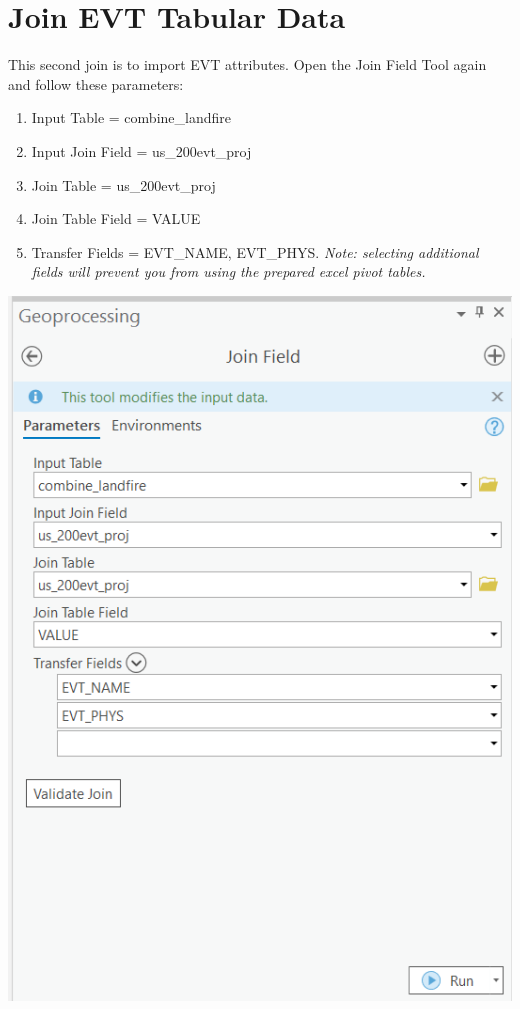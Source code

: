 \documentclass[
]{book}
\providecommand{\tightlist}{%
  \setlength{\itemsep}{0pt}\setlength{\parskip}{0pt}}
\begin{document}
\hypertarget{join-evt-tabular-data}{%
\section{Join EVT Tabular Data}\label{join-evt-tabular-data}}

This second join is to import EVT attributes. Open the Join Field Tool again and follow these parameters:

\begin{enumerate}
\def\labelenumi{\arabic{enumi}.}
\tightlist
\item
  Input Table = combine\_landfire
\item
  Input Join Field = us\_200evt\_proj
\item
  Join Table = us\_200evt\_proj
\item
  Join Table Field = VALUE
\item
  Transfer Fields = EVT\_NAME, EVT\_PHYS. \emph{Note: selecting additional fields will prevent you from using the prepared excel pivot tables.}
\end{enumerate}

\includegraphics[width=1000pt]{04_gis_screenshots/9_join_evt}
\end{document}
